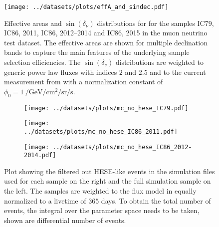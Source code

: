 \begin{figure}[htbp]
  \centering
  \texttt{[image: ../datasets/plots/effA\_and\_sindec.pdf]}
  \caption[Effective areas and $\sin(\delta_\nu)$ distributions]{
    Effective areas and $\sin(\delta_\nu)$ distributions for for the samples IC79, IC86, 2011, IC86, 2012--2014 and IC86, 2015 in the muon neutrino test dataset.
    The effective areas are shown for multiple declination bands to capture the main features of the underlying sample selection efficiencies.
    The $\sin(\delta_\nu)$ distributions are weighted to generic power law fluxes with indices $2$ and $2.5$ and to the current measurement from \cite{Haack:2017dxi} with a normalization constant of $\phi_0 = \SI[per-mode=reciprocal]{1}{\per\GeV\per\cm\squared\per\steradian\per\second}$.
    }
  \label{fig:effA_and_sindec}
\end{figure}


\begin{figure}[htbp]
  \centering
  \begin{subfigure}[t]{\textwidth}
    \centering
    \texttt{[image: ../datasets/plots/mc\_no\_hese\_IC79.pdf]}
  \end{subfigure}
  \hfill
  \begin{subfigure}[t]{\textwidth}
    \centering
    \texttt{[image: ../datasets/plots/mc\_no\_hese\_IC86\_2011.pdf]}
  \end{subfigure}
  \hfill
  \begin{subfigure}[t]{\textwidth}
    \centering
    \texttt{[image: ../datasets/plots/mc\_no\_hese\_IC86\_2012-2014.pdf]}
  \end{subfigure}
  \caption[HESE decorrelation for IC79, IC86'11, IC86'12--'14]{
    Plot showing the filtered out HESE-like events in the simulation files used for each sample on the right and the full simulation sample on the left.
    The samples are weighted to the flux model in \cite{Haack:2017dxi} equally normalized to a livetime of $365$ days.
    To obtain the total number of events, the integral over the parameter space needs to be taken, shown are differential number of events.
    }
  \label{fig:mc_no_hese_79_86I_86II}
\end{figure}
